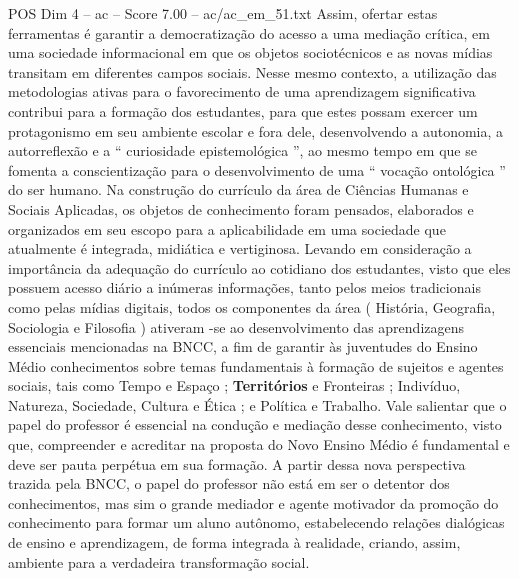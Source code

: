 \begin{textsample}{POS Dim 4 – ac – Score 7.00 – ac/ac\_em\_51.txt}
Assim, ofertar estas ferramentas é garantir a democratização do acesso a uma mediação crítica, em uma sociedade informacional em que os objetos sociotécnicos e as novas mídias transitam em diferentes campos sociais.
Nesse mesmo contexto, a utilização das metodologias ativas para o favorecimento de uma aprendizagem significativa contribui para a formação dos estudantes, para que estes possam exercer um protagonismo em seu ambiente escolar e fora dele, desenvolvendo a autonomia, a autorreflexão e a “ curiosidade epistemológica ”, ao mesmo tempo em que se fomenta a conscientização para o desenvolvimento de uma “ vocação ontológica ” do ser humano.
Na construção do currículo da área de Ciências Humanas e Sociais Aplicadas, os objetos de conhecimento foram pensados, elaborados e organizados em seu escopo para a aplicabilidade em uma sociedade que atualmente é integrada, midiática e vertiginosa.
Levando em consideração a importância da adequação do currículo ao cotidiano dos estudantes, visto que eles possuem acesso diário a inúmeras informações, tanto pelos meios tradicionais como pelas mídias digitais, todos os componentes da área ( História, Geografia, Sociologia e Filosofia ) ativeram -se ao desenvolvimento das aprendizagens essenciais mencionadas na BNCC, a fim de garantir às juventudes do Ensino Médio conhecimentos sobre temas fundamentais à formação de sujeitos e agentes sociais, tais como Tempo e Espaço ; \textbf{Territórios} e Fronteiras ; Indivíduo, Natureza, Sociedade, Cultura e Ética ; e Política e Trabalho.
Vale salientar que o papel do professor é essencial na condução e mediação desse conhecimento, visto que, compreender e acreditar na proposta do Novo Ensino Médio é fundamental e deve ser pauta perpétua em sua formação.
A partir dessa nova perspectiva trazida pela BNCC, o papel do professor não está em ser o detentor dos conhecimentos, mas sim o grande mediador e agente motivador da promoção do conhecimento para formar um aluno autônomo, estabelecendo relações dialógicas de ensino e aprendizagem, de forma integrada à realidade, criando, assim, ambiente para a verdadeira transformação social.

\end{textsample}

